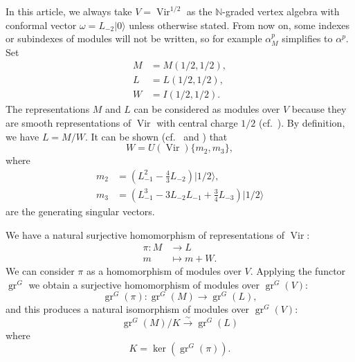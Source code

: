 \documentclass[12pt, reqno]{amsart}
\theoremstyle{remark}
\DeclareMathOperator{\Vir}{Vir}
\DeclareMathOperator{\gr}{gr}
\newcommand{\vac}{|0\rangle}
\newcommand{\vachalf}{|1/2\rangle}
\begin{document}
In this article, we always take $V = \Vir^{1/2}$ as the $\mathbb{N}$-graded vertex algebra with conformal vector $\omega = L_{-2}\vac$ unless otherwise stated.
From now on, some indexes or subindexes of modules will not be written, so for example $\alpha^p_M$ simplifies to $\alpha^p$.
Set
\begin{align*}
  M &= M(1/2, 1/2), \\
  L &= L(1/2, 1/2), \\
  W &= I(1/2, 1/2).
\end{align*}
The representations $M$ and $L$ can be considered as modules over $V$ because they are smooth representations of $\Vir$ with central charge $1/2$ (cf.\ \cite[Theorem 6.1.7]{lepowsky_introduction_2004}).
By definition, we have $L = M/W$.
It can be shown (cf.\ \cite{feigin_verma_1984} and \cite{astashkevich_structure_1997}) that
\begin{equation}
  \label{eq:5}
  W = U(\Vir)\{m_2, m_3\},
\end{equation}
where
\begin{align*}
  m_2 &= (L_{-1}^2 - \tfrac{4}{3}L_{-2})\vachalf, \\
  m_3 &= (L_{-1}^3 - 3L_{-2}L_{-1} + \tfrac{3}{4}L_{-3})\vachalf
\end{align*}
are the generating singular vectors.

We have a natural surjective homomorphism of representations of $\Vir$:
\begin{align*}
  \pi: M &\to L \\
  m &\mapsto m + W.
\end{align*}
We can consider $\pi$ as a homomorphism of modules over $V$.
Applying the functor $\gr^G$ we obtain a surjective homomorphism of modules over $\gr^G(V)$:
\begin{equation*}
  \gr^G(\pi): \gr^G(M) \to \gr^G(L),
\end{equation*}
and this produces a natural isomorphism of modules over $\gr^G(V)$:
\begin{equation*}
  \gr^G(M)/K \xrightarrow{\sim} \gr^G(L)
\end{equation*}
where
\begin{equation}
  \label{eq:6}
  K = \ker(\gr^G(\pi)).
\end{equation}
\end{document}
